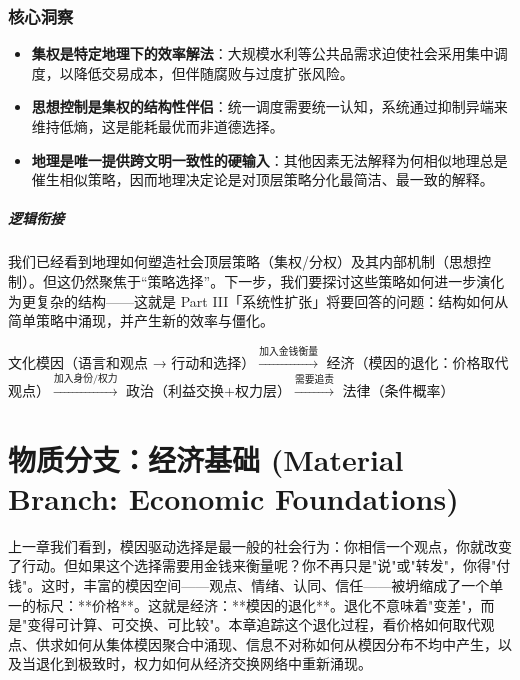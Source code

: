 \documentclass[openany, a4paper, 12pt]{book}
\newenvironment{logicmap}{
	\begin{tcolorbox}[
		colback=blue!5!white,      %
		colframe=blue!50!black,    %
		title=\textbf{逻辑地图 (Logic Map)}, %
		fonttitle=\bfseries,
		sharp corners=south,       %
		boxrule=0.5mm
		]
	\centering
	}{
	\end{tcolorbox}
}
\newenvironment{motivation}{
	\vspace{0.5em}
	\begin{tcolorbox}[
		colback=gray!10,           %
		colframe=gray!60,          %
		title=\textit{本章动机 (Motivation)},
		fonttitle=\bfseries,
		arc=0mm,                   %
		leftrule=3mm               %
		]
		\small \itshape %
	}{
	\end{tcolorbox}
	\vspace{1em}
}
\begin{document}
\subsection*{核心洞察}
\begin{itemize}
	\item \textbf{集权是特定地理下的效率解法}：大规模水利等公共品需求迫使社会采用集中调度，以降低交易成本，但伴随腐败与过度扩张风险。
	\item \textbf{思想控制是集权的结构性伴侣}：统一调度需要统一认知，系统通过抑制异端来维持低熵，这是能耗最优而非道德选择。
	\item \textbf{地理是唯一提供跨文明一致性的硬输入}：其他因素无法解释为何相似地理总是催生相似策略，因而地理决定论是对顶层策略分化最简洁、最一致的解释。
\end{itemize}

\paragraph*{逻辑衔接}
我们已经看到地理如何塑造社会顶层策略（集权/分权）及其内部机制（思想控制）。但这仍然聚焦于“策略选择”。下一步，我们要探讨这些策略如何进一步演化为更复杂的结构——这就是 Part III「系统性扩张」将要回答的问题：结构如何从简单策略中涌现，并产生新的效率与僵化。




	\begin{logicmap}
		文化模因（语言和观点 → 行动和选择）$\xrightarrow{\text{加入金钱衡量}}$ 经济（模因的退化：价格取代观点）$\xrightarrow{\text{加入身份/权力}}$ 政治（利益交换+权力层）$\xrightarrow{\text{需要追责}}$ 法律（条件概率）
	\end{logicmap}

	\chapter{物质分支：经济基础 (Material Branch: Economic Foundations)}
	\begin{motivation}
		上一章我们看到，模因驱动选择是最一般的社会行为：你相信一个观点，你就改变了行动。但如果这个选择需要用金钱来衡量呢？你不再只是"说"或"转发"，你得"付钱"。这时，丰富的模因空间——观点、情绪、认同、信任——被坍缩成了一个单一的标尺：**价格**。这就是经济：**模因的退化**。退化不意味着"变差"，而是"变得可计算、可交换、可比较"。本章追踪这个退化过程，看价格如何取代观点、供求如何从集体模因聚合中涌现、信息不对称如何从模因分布不均中产生，以及当退化到极致时，权力如何从经济交换网络中重新涌现。
	\end{motivation}
\end{document}

